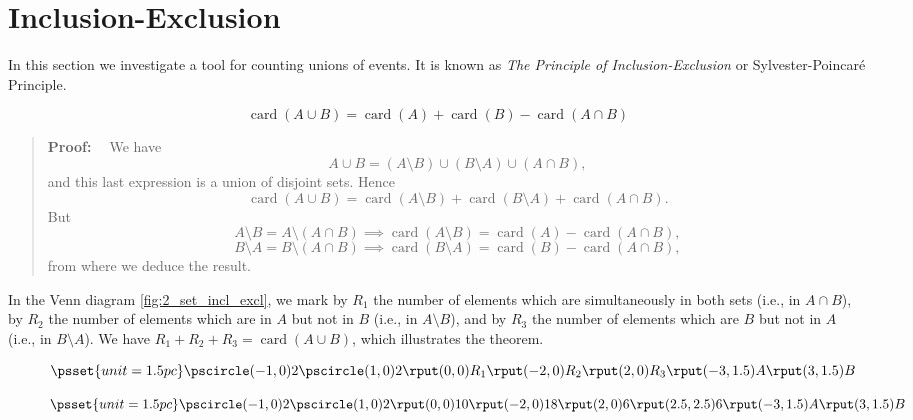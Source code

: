 \documentclass[11pt, openany]{book}
\theoremstyle{change} \theoremheaderfont{\blue\sffamily\bfseries}
\newcommand{\proofsymbol}{\Pisymbol{pzd}{113}}
\theoremstyle{nonumberplain} \theoremheaderfont{\sffamily\bfseries}
\newenvironment{pf}[0]{\itshape\begin{quote}{\bf Proof: \ }}{\proofsymbol\end{quote}}
\newcommand{\í}{\'{\i}}
\def\card#1{\operatorname{card}\left(#1\right)}
\begin{document}
\section{Inclusion-Exclusion}
 In this section we investigate a tool for counting unions of events. It is known as {\em The Principle
  of Inclusion-Exclusion} or Sylvester-Poincar\'{e} Principle.
\begin{thm} \label{thm:two_set_incl_excl}
$$\card{A \cup B} = \card{A} + \card{B} - \card{A \cap B}
$$\end{thm}
\begin{pf} We have  $$A\cup B = (A\setminus B) \cup (B\setminus A) \cup (A\cap B),$$
and this last expression is a union of disjoint sets. Hence
$$\card{A\cup B} = \card{A\setminus B}+ \card{B\setminus A} +\card{A\cap B}.$$
But $$ A\setminus B = A \setminus (A\cap B) \implies
\card{A\setminus B} = \card{A} - \card{A\cap B},$$ $$B\setminus A =
B \setminus (A\cap B) \implies \card{B\setminus A} = \card{B} -
\card{A\cap B},
$$from where we deduce the result.
\end{pf}
In the Venn diagram \ref{fig:2_set_incl_excl}, we mark by $R_1$ the
number of elements which  are simultaneously in both sets (i.e., in
$A \cap B$), by $R_2$ the number of elements which are in $A$ but
not in $B$ (i.e., in $A \setminus B$), and by $R_3$ the number of
elements which are $B$  but not in $A$ (i.e., in $B \setminus A$).
We have $R_1 + R_2 + R_3 = \card{A \cup B}$, which illustrates the
theorem.
 \vspace{2cm}
\begin{figure}[h]
\centering
\begin{minipage}{7cm}
$$
\psset{unit=1.5pc} \pscircle(-1,0){2} \pscircle(1,0){2}
\rput(0,0){R_1} \rput(-2, 0){R_2} \rput(2, 0){R_3}
\rput(-3, 1.5){A} \rput(3, 1.5){B}$$ \vspace{.5in}
\footnotesize{}
\label{fig:2_set_incl_excl}
\end{minipage}
\begin{minipage}{7cm}
$$
\psset{unit=1.5pc} \pscircle(-1,0){2} \pscircle(1,0){2}
\rput(0,0){\tiny 10} \rput(-2, 0){\tiny 18} \rput(2, 0){\tiny 6}
\rput(2.5, 2.5){\tiny 6} \rput(-3, 1.5){\tiny A} \rput(3, 1.5){\tiny
B} $$\vspace{1cm} \footnotesize\footnotesize{}\label{fig:incl_excl_1}\end{minipage}
\end{figure}
\end{document}
